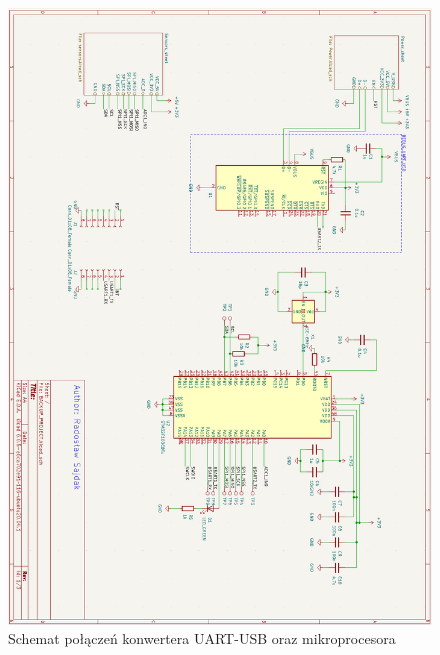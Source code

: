 \begin{figure}[H]
    \centering
    \includegraphics[width=\textwidth, height=\textheight, keepaspectratio]{Graphics/main_sch.png}
    \caption{Schemat połączeń konwertera UART-USB oraz mikroprocesora}
    \label{img:main_sch}
\end{figure}

